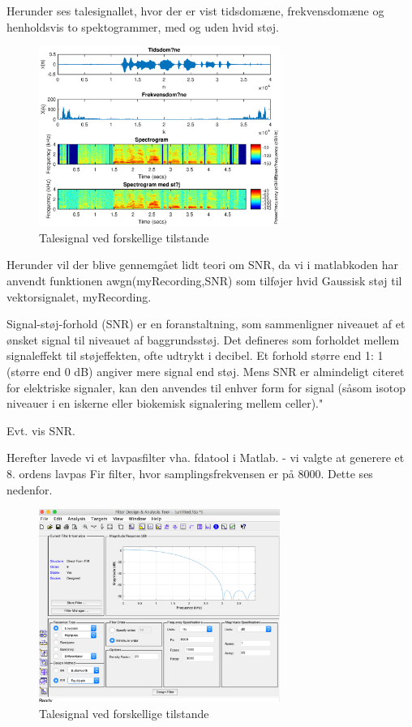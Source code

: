 \documentclass[a4paper]{report}
\begin{document}
Herunder ses talesignallet, hvor der er vist tidsdomæne, frekvensdomæne og henholdsvis to spektogrammer, med og uden hvid støj.

\begin{figure}[H] 
\centering
\includegraphics[width=0.7\textwidth]{grafer/White_noise_60}
\caption{Talesignal ved forskellige tilstande} \label{White_noise_60}
\end{figure}

Herunder vil der blive gennemgået lidt teori om SNR, da vi i matlabkoden har anvendt funktionen awgn(myRecording,SNR) som tilføjer hvid Gaussisk støj til vektorsignalet, myRecording. 

Signal-støj-forhold (SNR) er en foranstaltning, som sammenligner niveauet af et ønsket signal til niveauet af baggrundsstøj. Det defineres som forholdet mellem signaleffekt til støjeffekten, ofte udtrykt i decibel. Et forhold større end 1: 1 (større end 0 dB) angiver mere signal end støj. Mens SNR er almindeligt citeret for elektriske signaler, kan den anvendes til enhver form for signal (såsom isotop niveauer i en iskerne eller biokemisk signalering mellem celler)."  

Evt. vis SNR. 


Herefter lavede vi et lavpasfilter vha. fdatool i Matlab. - vi valgte at generere et 8. ordens lavpas Fir filter, hvor samplingsfrekvensen er på 8000. Dette ses nedenfor. 

\begin{figure}[H] 
\centering
\includegraphics[width=0.7\textwidth]{grafer/lavpasfilter}
\caption{Talesignal ved forskellige tilstande} \label{lavpasfilter}
\end{figure}
\end{document}
